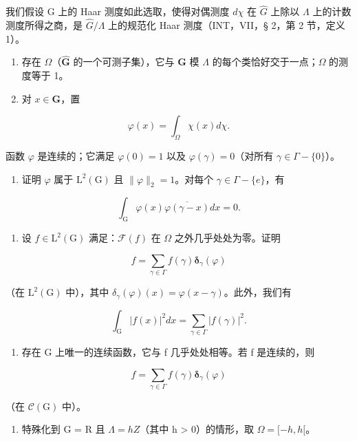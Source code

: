 我们假设 G 上的 Haar 测度如此选取，使得对偶测度 \(d\chi\) 在 \(\widehat{G}\) 上除以 \(\Lambda\) 上的计数测度所得之商，是 \(\widehat{G}/\Lambda\) 上的规范化 Haar 测度（INT，VII，§ 2，第 2 节，定义 1）。

\begin{enumerate}
\def\labelenumi{\alph{enumi})}
\item
  存在 \(\Omega\)（\(\widehat{\mathbf{G}}\) 的一个可测子集），它与 \(\mathbf{G}\) 模 \(\Lambda\) 的每个类恰好交于一点；\(\Omega\) 的测度等于 1。
\item
  对 \(x\in \mathbf{G}\)，置
\end{enumerate}

\[
\varphi (x) = \int_ {\Omega} \chi (x) d \chi .
\]

函数 \(\varphi\) 是连续的；它满足 \(\varphi(0) = 1\) 以及 \(\varphi(\gamma) = 0\)（对所有 \(\gamma \in \Gamma - \{0\}\)）。

\begin{enumerate}
\def\labelenumi{\alph{enumi})}
\setcounter{enumi}{2}
\tightlist
\item
  证明 \(\varphi\) 属于 \(\mathrm{L}^2 (\mathrm{G})\) 且 \(\| \varphi \| _2 = 1\)。对每个 \(\gamma \in \Gamma -\{e\}\)，有
\end{enumerate}

\[
\int_ {\mathrm{G}} \varphi (x) \overline {{\varphi (\gamma - x)}} d x = 0.
\]

\begin{enumerate}
\def\labelenumi{\alph{enumi})}
\setcounter{enumi}{3}
\tightlist
\item
  设 \(f \in \mathrm{L}^{2}(\mathrm{G})\) 满足：\(\mathcal{F}(f)\) 在 \(\Omega\) 之外几乎处处为零。证明
\end{enumerate}

\[
f = \sum_ {\gamma \in \Gamma} f (\gamma) \boldsymbol {\delta} _ {\gamma} (\varphi)
\]

（在 \(\mathrm{L}^2 (\mathrm{G})\) 中），其中 \(\delta_{\gamma}(\varphi)(x) = \varphi (x - \gamma)\)。此外，我们有

\[
\int_ {\mathrm{G}} | f (x) | ^ {2} d x = \sum_ {\gamma \in \Gamma} | f (\gamma) | ^ {2}.
\]

\begin{enumerate}
\def\labelenumi{\alph{enumi})}
\setcounter{enumi}{4}
\tightlist
\item
  存在 G 上唯一的连续函数，它与 f 几乎处处相等。若 f 是连续的，则
\end{enumerate}

\[
f = \sum_ {\gamma \in \Gamma} f (\gamma) \boldsymbol {\delta} _ {\gamma} (\varphi)
\]

（在 \(\mathcal{C}(\mathrm{G})\) 中）。

\begin{enumerate}
\def\labelenumi{\alph{enumi})}
\setcounter{enumi}{5}
\tightlist
\item
  特殊化到 G = R 且 \(\Lambda = hZ\)（其中 h \textgreater{} 0）的情形，取 \(\Omega = [-h, h[\)。
\end{enumerate}

